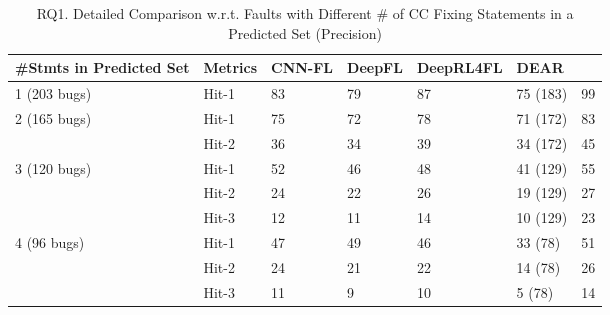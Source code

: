 


\begin{table}[t]
	\caption{RQ1. Detailed Comparison w.r.t. Faults with Different \# of CC Fixing Statements in a Predicted Set (Precision)}
\vspace{-10pt}
        \tabcolsep 2pt
	{\footnotesize
		\begin{center}
			\renewcommand{\arraystretch}{1}
			\begin{tabular}{p{1.3cm}<{\centering}|p{0.8cm}<{\centering}|p{1cm}<{\centering}|p{0.8cm}<{\centering}|p{1.3cm}<{\centering}|p{1cm}<{\centering}|p{1.3cm}<{\centering}}
				\hline
				\#Stmts in Predicted Set & Metrics & CNN-FL & DeepFL & DeepRL4FL & DEAR & \tool \\
				\hline
				\multirow{1}{*}{1 (203 bugs)}   & Hit-1  & 83 & 79 & 87 & 75 (183)& 99 \\
				\hline
				\multirow{2}{*}{2 (165 bugs)}  & Hit-1   & 75 & 72 & 78 & 71 (172) & 83 \\
				& Hit-2       						& 36 & 34 & 39 & 34 (172) & 45 \\
				\hline
				\multirow{3}{*}{3 (120 bugs)}  & Hit-1    & 52 & 46 & 48 & 41 (129) & 55 \\
				& Hit-2         					& 24 & 22 & 26 & 19 (129) & 27\\
				& Hit-3         				  	& 12 &11 & 14 & 10 (129) & 23 \\
				\hline
				\multirow{4}{*}{4 (96 bugs)}  & Hit-1    & 47 & 49 & 46 & 33 (78) & 51 \\
				& Hit-2        				    	 &24 & 21 & 22 & 14 (78) & 26 \\
				& Hit-3       					    & 11 & 9 & 10 & 5 (78) & 14 \\

\end{tabular}
\end{center}}
\end{table}
